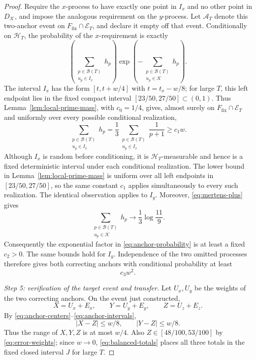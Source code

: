 \documentclass[11pt]{article}
\numberwithin{equation}{section}
\theoremstyle{plain}
\newcommand{\1}{\mathbf 1}
\newcommand{\cB}{\mathcal B}
\begin{document}
\begin{proof}
Require the $x$-process to have exactly one point in $I_x$ and no other
point in $D_{\mathcal K}$, and impose the analogous requirement on the
$y$-process.  Let $\mathcal A_T$ denote this two-anchor event on
$F_{\mathrm{fix}}\cap\mathcal E_T$, and declare it empty off that event.
Conditionally on $\mathcal H_T$, the probability of the
$x$-requirement is exactly
\begin{equation}\label{eq:anchor-probability}
 \left(
 \sum_{\substack{p\in\cB(T)\\u_p\in I_x}}h_p
 \right)
 \exp\!\left(
 -\sum_{\substack{p\in\cB(T)\\u_p\in\mathcal K}}h_p
 \right).
\end{equation}
The interval $I_x$ has the form $[t,t+w/4]$ with
$t=t_x-w/8$; for large $T$, this left endpoint lies in the fixed compact
interval $[23/50,27/50]\subset(0,1)$.  Thus
Lemma~\ref{lem:local-prime-mass}, with $c_0=1/4$, gives, almost surely on
$F_{\mathrm{fix}}\cap\mathcal E_T$ and uniformly over every possible
conditional realization,
\[
 \sum_{\substack{p\in\cB(T)\\u_p\in I_x}}h_p
 =\frac13\sum_{\substack{p\in\cB(T)\\u_p\in I_x}}\frac1{p+1}
 \ge c_1w.
\]
Although $I_x$ is random before conditioning, it is
$\mathcal H_T$-measurable and hence is a fixed deterministic interval
under each conditional realization.  The lower bound in
Lemma~\ref{lem:local-prime-mass} is uniform over all left endpoints in
$[23/50,27/50]$, so the same constant $c_1$ applies simultaneously to
every such realization.  The identical observation applies to $I_y$.
Moreover, \eqref{eq:mertens-plus} gives
\[
 \sum_{\substack{p\in\cB(T)\\u_p\in\mathcal K}}h_p
 \longrightarrow\frac13\log\frac{11}{9}.
\]
Consequently the exponential factor in \eqref{eq:anchor-probability} is at
least a fixed $c_2>0$.  The same bounds hold for $I_y$.  Independence of the two
omitted processes therefore gives both correcting anchors with
conditional probability at least
\begin{equation}\label{eq:two-anchor-lower}
 c_3w^2.
\end{equation}

\smallskip
\noindent\emph{Step 5: verification of the target event and transfer.}
Let $U_x,U_y$ be the weights of the two correcting anchors.  On the event
just constructed,
\[
 X=U_x+E_x,\qquad
 Y=U_y+E_y,\qquad
 Z=U_z+E_z.
\]
By \eqref{eq:anchor-centers}--\eqref{eq:anchor-intervals},
\begin{equation}\label{eq:balanced-totals}
 |X-Z|\le w/8,\qquad |Y-Z|\le w/8.
\end{equation}
Thus the range of $X,Y,Z$ is at most $w/4$.  Also
$Z\in[48/100,53/100]$ by \eqref{eq:error-weights}; since $w\to0$,
\eqref{eq:balanced-totals} places all three totals in the fixed closed
interval $J$ for large $T$.


\end{proof}
\end{document}
